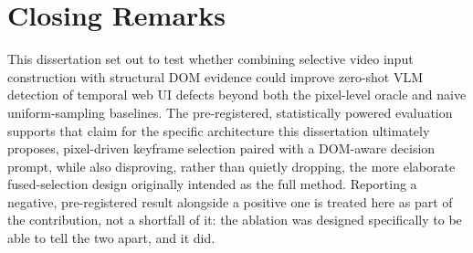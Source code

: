\section{Closing Remarks}
This dissertation set out to test whether combining selective video input construction with structural DOM evidence could improve zero-shot VLM detection of temporal web UI defects beyond both the pixel-level oracle and naive uniform-sampling baselines. The pre-registered, statistically powered evaluation supports that claim for the specific architecture this dissertation ultimately proposes, pixel-driven keyframe selection paired with a DOM-aware decision prompt, while also disproving, rather than quietly dropping, the more elaborate fused-selection design originally intended as the full method. Reporting a negative, pre-registered result alongside a positive one is treated here as part of the contribution, not a shortfall of it: the ablation was designed specifically to be able to tell the two apart, and it did.

